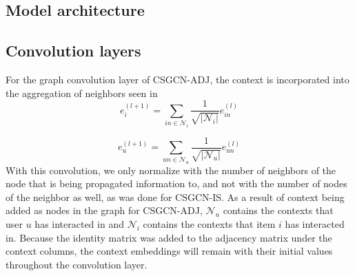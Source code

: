 \subsection{Model architecture}\label{subsec:csgcn_adj_architecture}

\subsection{Convolution layers}\label{subsec:csgcn_adj_conv_layer}
For the graph convolution layer of CSGCN-ADJ, the context is incorporated into the aggregation of neighbors seen in 
\begin{equation}\label{eq:csgcn_adj_gc_layer_item}
    e_{i}^{(l+1)}=\sum_{in\in \mathcal{N}_{i}}\frac{1}{\sqrt{|\mathcal{N}_{i}|} }e_{in}^{(l)}
\end{equation}

\begin{equation}\label{eq:csgcn_adj_gc_layer_user}
     e_{u}^{(l+1)}=\sum_{un\in \mathcal{N}_{u}}\frac{1}{ \sqrt{|\mathcal{N}_{u}|}}e_{un}^{(l)}
\end{equation}
With this convolution, we only normalize with the number of neighbors of the node that is being propagated information to, and not with the number of nodes of the neighbor as well, as was done for CSGCN-IS.
As a result of context being added as nodes in the graph for CSGCN-ADJ, $\mathcal{N}_{u}$ contains the contexts that user $u$ has interacted in and $\mathcal{N}_{i}$ contains the contexts that item $i$ has interacted in.
Because the identity matrix was added to the adjacency matrix under the context columns, the context embeddings will remain with their initial values throughout the convolution layer.

